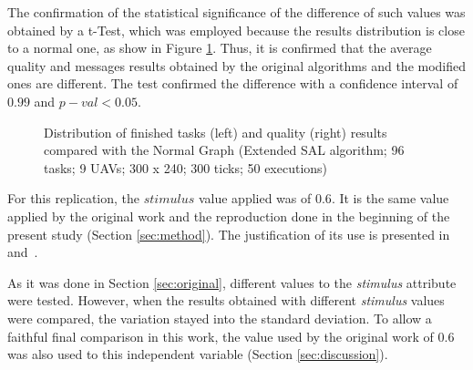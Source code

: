 The confirmation of the statistical significance of the difference of such values was obtained by a t-Test, which was employed because the results distribution is close to a normal one, as show in Figure \ref{fig:fig07}. Thus, it is confirmed that the average quality and messages results obtained by the original algorithms and the modified ones are different. The test confirmed the difference with a confidence interval of $0.99$ and $p-val<0.05$. 

\begin{figure}[!htb]
\centering
{}
\quad
{}
\caption{Distribution of finished tasks (left) and quality (right) results compared with the Normal Graph (Extended SAL algorithm; 96 tasks; 9 UAVs; 300 x 240; 300 ticks; 50 executions)}
\label{fig:fig07}
\end{figure}

For this replication, the $stimulus$ value applied was of $0.6$. It is the same value applied by the original work and the reproduction done in the beginning of the present study (Section \ref{sec:method}). The justification of its use is presented in~\citep{MAS07} and~\citep{ferreira2007swarm}.

As it was done in Section \ref{sec:original}, different values to the \textit{stimulus} attribute were tested. However, when the results obtained with different \textit{stimulus} values were compared, the variation stayed into the standard deviation. To allow a faithful final comparison in this work, the value used by the original work \citep{MAS07} of $0.6$ was also used to this independent variable (Section \ref{sec:discussion}).
